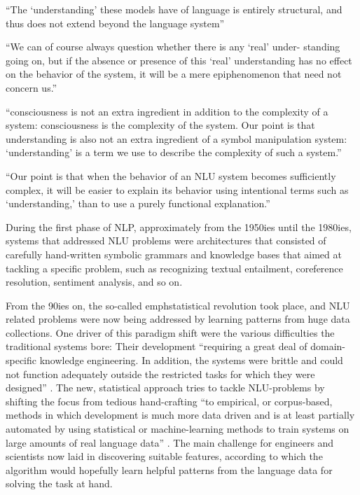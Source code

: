``The `understanding' these models have of language is entirely structural,
and thus does not extend beyond the language system'' \cite{sahlgren2021singleton}

``We can of course always question whether there is any `real' under-
standing going on, but if the absence or presence of this `real' understanding
has no effect on the behavior of the system, it will be a mere epiphenomenon
that need not concern us.'' \cite{sahlgren2021singleton}

``consciousness is not an extra ingredient in addition to the complexity of a system:
consciousness is the complexity of the system. Our point is that understanding is also
not an extra ingredient of a symbol manipulation system: `understanding' is a term we
use to describe the complexity of such a system.'' \cite{sahlgren2021singleton}

``Our point is that when the behavior of an NLU system becomes sufficiently complex, it will be
easier to explain its behavior using intentional terms such as `understanding,' than to use a
purely functional explanation.'' \cite{sahlgren2021singleton}

During the first phase of NLP, approximately from the 1950ies until the 1980ies, systems
that addressed NLU problems were architectures that consisted of carefully hand-written
symbolic grammars and knowledge bases that aimed at tackling a specific problem, such as
recognizing textual entailment, coreference resolution, sentiment analysis, and so on.

From the 90ies on, the so-called emph{statistical revolution} took place, and NLU related
problems were now being addressed by learning patterns from huge data collections. One driver
of this paradigm shift were the various difficulties the traditional systems bore: Their
development ``requiring a great deal of domain-specific knowledge engineering. In addition,
the systems were brittle and could not function adequately outside the restricted tasks for
which they were designed'' \citep[p.~13]{brill1997overview}.
The new, statistical {\color{red} approach} tries to tackle NLU-problems by shifting
the focus from tedious hand-crafting ``to empirical, or corpus-based, methods in which
development is much more data driven and is
at least partially automated by using statistical
or machine-learning methods to train systems
on large amounts of real language data'' \citep[p.~13]{brill1997overview}.
The main challenge for engineers and scientists now laid in discovering suitable features, according
to which the algorithm would hopefully learn helpful patterns from the language data for solving
the task at hand.

